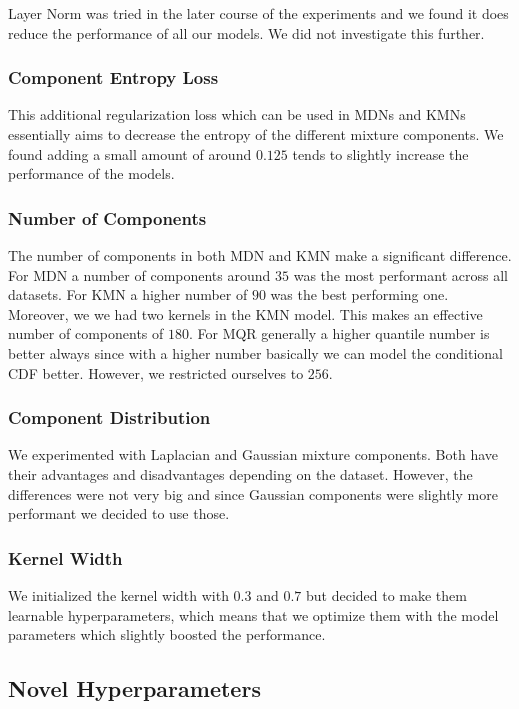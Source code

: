 Layer Norm was tried in the later course of the experiments and we found it does reduce the performance of all our models. We did not investigate this further.

\subsubsection{Component Entropy Loss}

This additional regularization loss which can be used in MDNs and KMNs essentially aims to decrease the entropy of the different mixture components. We found adding a small amount of around $0.125$ tends to slightly increase the performance of the models.

\subsubsection{Number of Components}

The number of components in both MDN and KMN make a significant difference. For MDN a number of components around $35$ was the most performant across all datasets. For KMN a higher number of $90$ was the best performing one. Moreover, we we had two kernels in the KMN model. This makes an effective number of components of $180$. For MQR generally a higher quantile number is better always since with a higher number basically we can model the conditional CDF better. However, we restricted ourselves to $256$.

\subsubsection{Component Distribution}
We experimented with Laplacian and Gaussian mixture components. Both have their advantages and disadvantages depending on the dataset. However, the differences were not very big and since Gaussian components were slightly more performant we decided to use those.

\subsubsection{Kernel Width}
We initialized the kernel width with $0.3$ and $0.7$ but decided to make them learnable hyperparameters, which means that we optimize them with the model parameters which slightly boosted the performance.

\subsection{Novel Hyperparameters}


